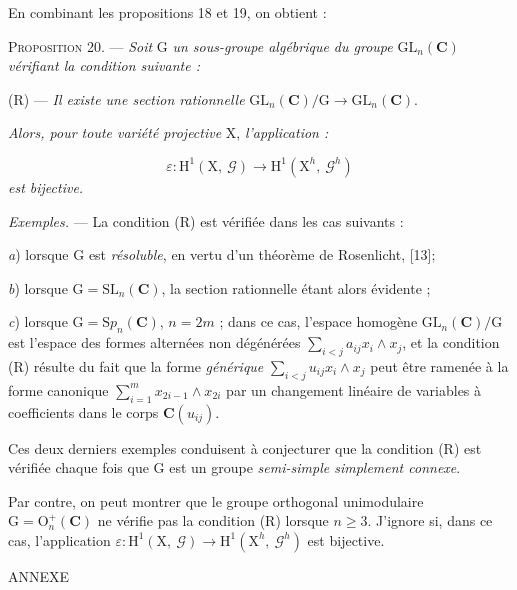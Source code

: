 En combinant les propositions 18 et 19, on obtient :

\textsc{Proposition} 20. --- \textit{Soit} $\mathrm{G}$ \textit{un sous-groupe algébrique du groupe} $\mathrm{GL}_n(\mathbf{C})$ \textit{vérifiant la condition suivante :}

(R) --- \textit{Il existe une section rationnelle} $\mathrm{GL}_n(\mathbf{C})/\mathrm{G} \to \mathrm{GL}_n(\mathbf{C})$.



\textit{Alors, pour toute variété projective} $\mathrm{X}$, \textit{l'application :}

\begin{equation*}
\varepsilon : \mathrm{H}^1(\mathrm{X},\ \mathcal{G}) \to \mathrm{H}^1(\mathrm{X}^h,\ \mathcal{G}^h)
\end{equation*}
\textit{est bijective.}

\textit{Exemples.} --- La condition (R) est vérifiée dans les cas suivants :

\textit{a}) lorsque $\mathrm{G}$ est \textit{résoluble}, en vertu d'un théorème de Rosenlicht, [13];

\textit{b}) lorsque $\mathrm{G} = \mathrm{SL}_n(\mathbf{C})$, la section rationnelle étant alors évidente ;

\textit{c}) lorsque $\mathrm{G} = \mathrm{S}p_n(\mathbf{C})$, $n = 2m$ ; dans ce cas, l'espace homogène $\mathrm{GL}_n(\mathbf{C})/\mathrm{G}$ est l'espace des formes alternées non dégénérées $\sum\limits_{i<j} a_{ij} x_i \wedge x_j$, et la condition (R) résulte du fait que la forme \textit{générique} $\sum\limits_{i<j} u_{ij} x_i \wedge x_j$ peut être ramenée à la forme canonique $\sum\limits_{i=1}^{m} x_{2i-1} \wedge x_{2i}$ par un changement linéaire de variables à coefficients dans le corps $\mathbf{C}(u_{ij})$.

Ces deux derniers exemples conduisent à conjecturer que la condition (R) est vérifiée chaque fois que $\mathrm{G}$ est un groupe \textit{semi-simple simplement connexe}.

Par contre, on peut montrer que le groupe orthogonal unimodulaire $\mathrm{G} = \mathrm{O}_n^+(\mathbf{C})$ ne vérifie pas la condition (R) lorsque $n \geqslant 3$. J'ignore si, dans ce cas, l'application $\varepsilon : \mathrm{H}^1(\mathrm{X},\ \mathcal{G}) \to \mathrm{H}^1(\mathrm{X}^h,\ \mathcal{G}^h)$ est bijective.


\begin{center}ANNEXE\end{center}

